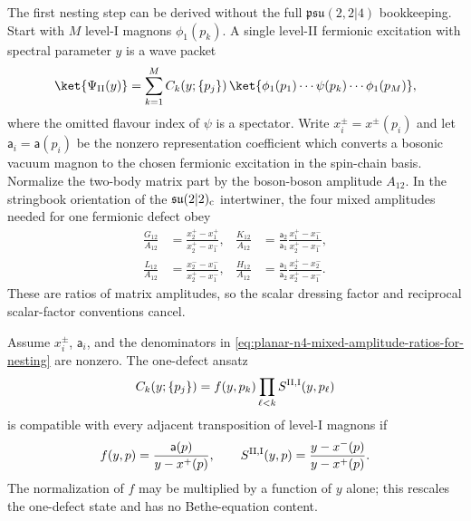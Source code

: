 The first nesting step can be derived without the full
\(\mathfrak{psu}(2,2|4)\) bookkeeping.  Start with \(M\) level-I magnons
\(\phi_1(p_k)\).  A single level-II fermionic excitation with spectral
parameter \(y\) is a wave packet
\[
  \ket{\Psi_{\rm II}(y)}
  =
  \sum_{k=1}^M
  C_k(y;\{p_j\})\,
  \ket{\phi_1(p_1)\cdots\psi(p_k)\cdots\phi_1(p_M)} ,
\]
where the omitted flavour index of \(\psi\) is a spectator.  Write
\(x_i^\pm=x^\pm(p_i)\) and let \(\mathsf a_i=\mathsf a(p_i)\) be the
nonzero representation coefficient which converts a bosonic vacuum magnon
to the chosen fermionic excitation in the spin-chain basis.  Normalize the
two-body matrix part by the boson-boson amplitude \(A_{12}\).  In the
stringbook orientation of the \(\mathfrak{su}(2|2)_{\rm c}\) intertwiner,
the four mixed amplitudes needed for one fermionic defect obey
\begin{equation}
\begin{aligned}
  \frac{G_{12}}{A_{12}}
  &=
  \frac{x_2^+-x_1^+}{x_2^+-x_1^-},
  &
  \frac{K_{12}}{A_{12}}
  &=
  \frac{\mathsf a_2}{\mathsf a_1}
  \frac{x_1^+-x_1^-}{x_2^+-x_1^-},\\
  \frac{L_{12}}{A_{12}}
  &=
  \frac{x_2^--x_1^-}{x_2^+-x_1^-},
  &
  \frac{H_{12}}{A_{12}}
  &=
  \frac{\mathsf a_1}{\mathsf a_2}
  \frac{x_2^+-x_2^-}{x_2^+-x_1^-}.
\end{aligned}
  \label{eq:planar-n4-mixed-amplitude-ratios-for-nesting}
\end{equation}
These are ratios of matrix amplitudes, so the scalar dressing factor and
reciprocal scalar-factor conventions cancel.

\begin{lemma}
\label{lem:planar-n4-single-level-ii-nesting-step}
Assume \(x_i^\pm\), \(\mathsf a_i\), and the denominators in
\eqref{eq:planar-n4-mixed-amplitude-ratios-for-nesting} are nonzero.  The
one-defect ansatz
\[
  C_k(y;\{p_j\})
  =
  f(y,p_k)\prod_{\ell<k}S^{{\rm II},{\rm I}}(y,p_\ell)
\]
is compatible with every adjacent transposition of level-I magnons if
\begin{equation}
  f(y,p)=\frac{\mathsf a(p)}{y-x^+(p)},
  \qquad
  S^{{\rm II},{\rm I}}(y,p)
  =
  \frac{y-x^-(p)}{y-x^+(p)} .
  \label{eq:planar-n4-single-level-ii-data}
\end{equation}
The normalization of \(f\) may be multiplied by a function of \(y\) alone;
this rescales the one-defect state and has no Bethe-equation content.
\end{lemma}

